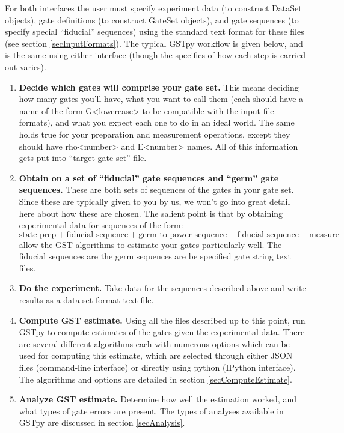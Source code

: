 \documentclass{article}[11pt]
\begin{document}
For both interfaces the user must specify experiment data (to construct DataSet objects), gate definitions (to construct GateSet objects), and gate sequences (to specify special ``fiducial'' sequences) using the standard text format for these files (see section \ref{secInputFormats}).  The typical GSTpy workflow is given below, and is the same using either interface (though the specifics of how each step is carried out varies).
\begin{enumerate}
\item \textbf{Decide which gates will comprise your gate set.}  This means deciding how many gates you'll have, what you want to call them (each should have a name of the form G<lowercase> to be compatible with the input file formats), and what you expect each one to do in an ideal world.  The same holds true for your preparation and measurement operations, except they should have rho<number> and E<number> names.  All of this information gets put into ``target gate set'' file.
\item \textbf{Obtain on a set of ``fiducial'' gate sequences and ``germ'' gate sequences.}  These are both sets of sequences of the gates in your gate set. Since these are typically given to you by us, we won't go into great detail here about how these are chosen.  The salient point is that by obtaining experimental data for sequences of the form: $$\mbox{state-prep} + \mbox{fiducial-sequence} + \mbox{germ-to-power-sequence} + \mbox{fiducial-sequence} + \mbox{measure}$$ allow the GST algorithms to estimate your gates particularly well.  The fiducial sequences are the germ sequences are be specified gate string text files.
\item \textbf{Do the experiment.}  Take data for the sequences described above and write results as a data-set format text file.
\item \textbf{Compute GST estimate.}  Using all the files described up to this point, run GSTpy to compute estimates of the gates given the experimental data.  There are several different algorithms each with numerous options which can be used for computing this estimate, which are selected through either JSON files (command-line interface) or directly using python (IPython interface).  The algorithms and options are detailed in section \ref{secComputeEstimate}.
\item \textbf{Analyze GST estimate.}  Determine how well the estimation worked, and what types of gate errors are present.  The types of analyses available in GSTpy are discussed in section \ref{secAnalysis}.
\end{enumerate}
\end{document}
